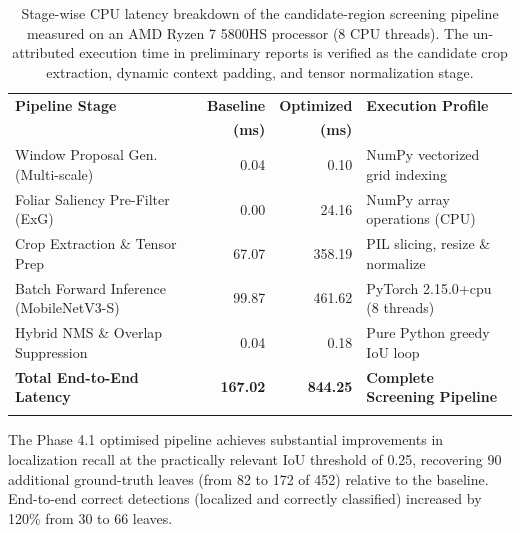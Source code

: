 \documentclass[pdflatex,sn-mathphys-num]{sn-jnl}
\theoremstyle{thmstyleone}%
\theoremstyle{thmstyletwo}%
\theoremstyle{thmstylethree}%
\begin{document}
\begin{table}[h]
\caption{Stage-wise CPU latency breakdown of the candidate-region screening pipeline measured on an AMD Ryzen 7 5800HS processor (8 CPU threads). The un-attributed execution time in preliminary reports is verified as the candidate crop extraction, dynamic context padding, and tensor normalization stage.}\label{tab:latency_breakdown}%
\setlength{\tabcolsep}{4pt}%
\begin{tabular*}{\textwidth}{@{\extracolsep\fill}lrrp{4.0cm}}
\toprule
\textbf{Pipeline Stage} & \textbf{Baseline} & \textbf{Optimized} & \textbf{Execution Profile} \\
& \textbf{(ms)} & \textbf{(ms)} & \\
\midrule
Window Proposal Gen. (Multi-scale)       & 0.04 &   0.10 & \raggedright NumPy vectorized grid indexing \\
Foliar Saliency Pre-Filter (ExG)         & 0.00 &  24.16 & \raggedright NumPy array operations (CPU) \\
Crop Extraction \& Tensor Prep           & 67.07 & 358.19 & \raggedright PIL slicing, resize \& normalize \\
Batch Forward Inference (MobileNetV3-S)  & 99.87 & 461.62 & \raggedright PyTorch 2.15.0+cpu (8 threads) \\
Hybrid NMS \& Overlap Suppression        & 0.04 &   0.18 & \raggedright Pure Python greedy IoU loop \\
\midrule
\textbf{Total End-to-End Latency}        & \textbf{167.02} & \textbf{844.25} & \raggedright \textbf{Complete Screening Pipeline} \\
\botrule
\end{tabular*}
\end{table}

The Phase 4.1 optimised pipeline achieves substantial improvements in localization
recall at the practically relevant IoU threshold of 0.25, recovering 90 additional
ground-truth leaves (from 82 to 172 of 452) relative to the baseline. End-to-end
correct detections (localized and correctly classified) increased by 120\% from 30 to
66 leaves.
\end{document}
